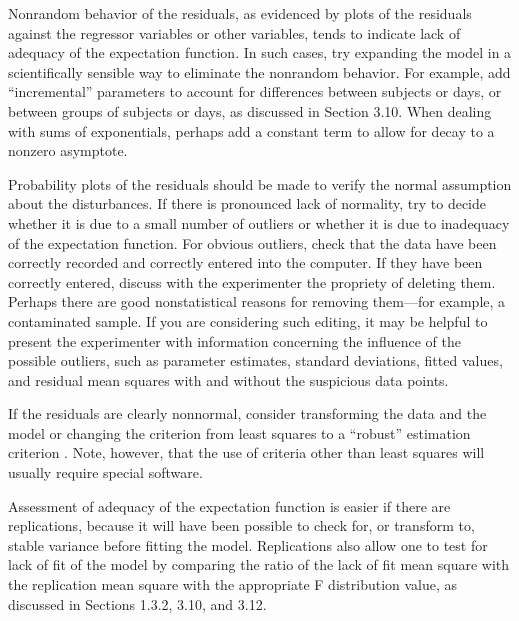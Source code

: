 Nonrandom behavior of the residuals, as evidenced by plots of the
residuals against the regressor variables or other variables,
tends to indicate lack of adequacy of the expectation function.
In such cases, try expanding the model in a scientifically
sensible way to eliminate the nonrandom behavior.
For example, add ``incremental''
parameters to account for differences between
subjects or days, or between groups of subjects or days, as
discussed in Section 3.10.
When dealing with sums of exponentials, perhaps add a constant
term to allow for decay to a nonzero asymptote.

Probability plots of the residuals should be made to verify the normal
assumption about the disturbances.
If there is pronounced lack of normality, try to decide
whether it is due to a small number of outliers or whether it is
due to inadequacy of the expectation function.
For obvious outliers, check that the data have been correctly
recorded and correctly entered into the computer.
If they have been correctly entered, discuss
with the experimenter
the propriety of deleting them.
Perhaps there are good nonstatistical reasons for removing
them---for example, a contaminated sample.
If you are considering such editing, it may be helpful to present
the experimenter with information concerning the influence of the
possible outliers, such as parameter estimates,
standard deviations, fitted values, and residual mean squares
with and without the suspicious data points.

If the residuals are clearly nonnormal, consider
transforming the data and the model \cite{carr:rupp:1984} or
changing the criterion from least squares to a ``robust''
estimation criterion
\cite{hube:1981}.
Note, however, that the use of
criteria other than least squares will usually require special software.

Assessment of adequacy of the expectation function is easier if
there are replications, because it will have been
possible to check for, or transform to, stable variance before
fitting the model.
Replications also allow one to test for lack of fit of the model
by comparing the ratio of the lack of fit mean square with the
replication mean square with the appropriate F distribution value,
as discussed in Sections 1.3.2, 3.10, and 3.12.

